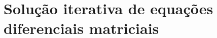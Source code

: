 
\chapter{Solução iterativa de equações diferenciais matriciais}%




\newpage


\newpage


\newpage



